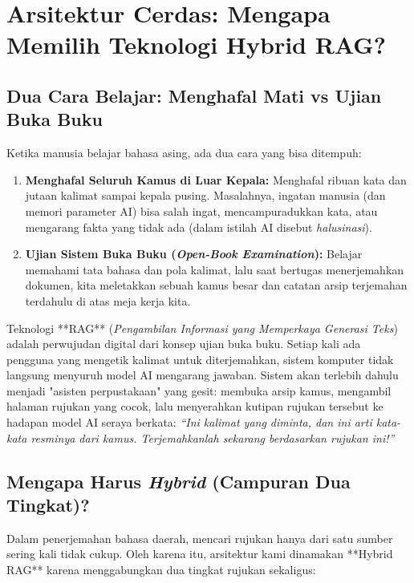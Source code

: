 \chapter{Arsitektur Cerdas: Mengapa Memilih Teknologi Hybrid RAG?}

\section{Dua Cara Belajar: Menghafal Mati vs Ujian Buka Buku}
Ketika manusia belajar bahasa asing, ada dua cara yang bisa ditempuh:
\begin{enumerate}
    \item \textbf{Menghafal Seluruh Kamus di Luar Kepala:} Menghafal ribuan kata dan jutaan kalimat sampai kepala pusing. Masalahnya, ingatan manusia (dan memori parameter AI) bisa salah ingat, mencampuradukkan kata, atau mengarang fakta yang tidak ada (dalam istilah AI disebut \textit{halusinasi}).
    \item \textbf{Ujian Sistem Buka Buku (\textit{Open-Book Examination}):} Belajar memahami tata bahasa dan pola kalimat, lalu saat bertugas menerjemahkan dokumen, kita meletakkan sebuah kamus besar dan catatan arsip terjemahan terdahulu di atas meja kerja kita.
\end{enumerate}

\begin{infobox}
Teknologi **RAG** (\textit{Pengambilan Informasi yang Memperkaya Generasi Teks}) adalah perwujudan digital dari konsep ujian buka buku. Setiap kali ada pengguna yang mengetik kalimat untuk diterjemahkan, sistem komputer tidak langsung menyuruh model AI mengarang jawaban. Sistem akan terlebih dahulu menjadi "asisten perpustakaan" yang gesit: membuka arsip kamus, mengambil halaman rujukan yang cocok, lalu menyerahkan kutipan rujukan tersebut ke hadapan model AI seraya berkata: \textit{“Ini kalimat yang diminta, dan ini arti kata-kata resminya dari kamus. Terjemahkanlah sekarang berdasarkan rujukan ini!”}
\end{infobox}

\section{Mengapa Harus \textit{Hybrid} (Campuran Dua Tingkat)?}
Dalam penerjemahan bahasa daerah, mencari rujukan hanya dari satu sumber sering kali tidak cukup. Oleh karena itu, arsitektur kami dinamakan **Hybrid RAG** karena menggabungkan dua tingkat rujukan sekaligus:

